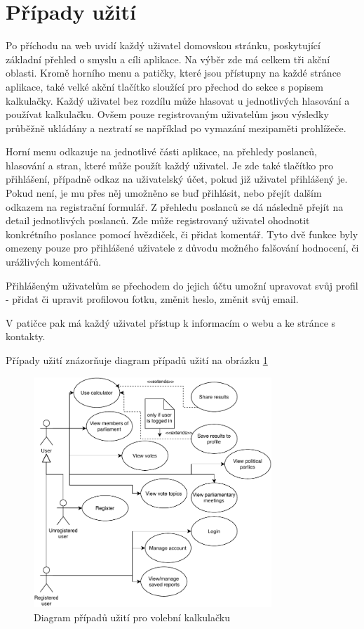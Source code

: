 \section{Případy užití}
Po příchodu na web uvidí každý uživatel domovskou stránku, poskytující základní přehled o smyslu a cíli aplikace. Na výběr zde má celkem tři akční oblasti. Kromě horního menu a patičky, které jsou přístupny na každé stránce aplikace, také velké akční tlačítko sloužící pro přechod do sekce s popisem kalkulačky. Každý uživatel bez rozdílu může hlasovat u jednotlivých hlasování a používat kalkulačku. Ovšem pouze registrovaným uživatelům jsou výsledky průběžně ukládány a neztratí se například po vymazání mezipaměti prohlížeče.
\par Horní menu odkazuje na jednotlivé části aplikace, na přehledy poslanců, hlasování a stran, které může použít každý uživatel. Je zde také tlačítko pro přihlášení, případně odkaz na uživatelský účet, pokud již uživatel přihlášený je. Pokud není, je mu přes něj umožněno se buď přihlásit, nebo přejít dalším odkazem na registrační formulář. Z přehledu poslanců se dá následně přejít na detail jednotlivých poslanců. Zde může registrovaný uživatel ohodnotit konkrétního poslance pomocí hvězdiček, či přidat komentář. Tyto dvě funkce byly omezeny pouze pro přihlášené uživatele z důvodu možného falšování hodnocení, či urážlivých komentářů. 
\par Přihlášeným uživatelům se přechodem do jejich účtu umožní upravovat svůj profil - přidat či upravit profilovou fotku, změnit heslo, změnit svůj email.
\par V patičce pak má každý uživatel přístup k informacím o webu a ke stránce s kontakty.

\par
Případy užití znázorňuje diagram případů užití na obrázku \ref{fig:diagram_uc}

\begin{figure}
    \centering
    \includegraphics[width=0.8\textwidth]{obrazky-figures/UC.pdf}
    \caption{Diagram případů užití pro volební kalkulačku}
    \label{fig:diagram_uc}
\end{figure}



